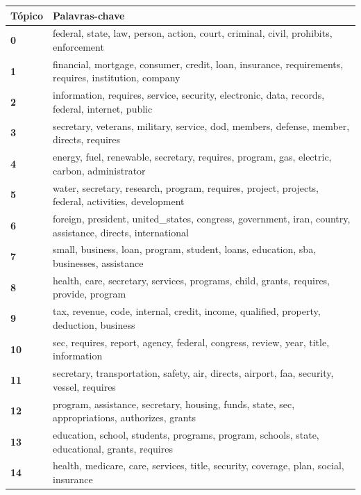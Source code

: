 \begin{table}[htpb]
    \centering
    \scriptsize
    \begin{tabularx}{\textwidth}{@{}l X@{}}
        \toprule
        \textbf{Tópico} & \textbf{Palavras-chave} \\
        \midrule
        \textbf{0} & federal, state, law, person, action, court, criminal, civil, prohibits, enforcement \\
        \textbf{1} & financial, mortgage, consumer, credit, loan, insurance, requirements, requires, institution, company \\
        \textbf{2} & information, requires, service, security, electronic, data, records, federal, internet, public \\
        \textbf{3} & secretary, veterans, military, service, dod, members, defense, member, directs, requires \\
        \textbf{4} & energy, fuel, renewable, secretary, requires, program, gas, electric, carbon, administrator \\
        \textbf{5} & water, secretary, research, program, requires, project, projects, federal, activities, development \\
        \textbf{6} & foreign, president, united\_states, congress, government, iran, country, assistance, directs, international \\
        \textbf{7} & small, business, loan, program, student, loans, education, sba, businesses, assistance \\
        \textbf{8} & health, care, secretary, services, programs, child, grants, requires, provide, program \\
        \textbf{9} & tax, revenue, code, internal, credit, income, qualified, property, deduction, business \\
        \textbf{10} & sec, requires, report, agency, federal, congress, review, year, title, information \\
        \textbf{11} & secretary, transportation, safety, air, directs, airport, faa, security, vessel, requires \\
        \textbf{12} & program, assistance, secretary, housing, funds, state, sec, appropriations, authorizes, grants \\
        \textbf{13} & education, school, students, programs, program, schools, state, educational, grants, requires \\
        \textbf{14} & health, medicare, care, services, title, security, coverage, plan, social, insurance \\

\end{tabularx}
\end{table}
